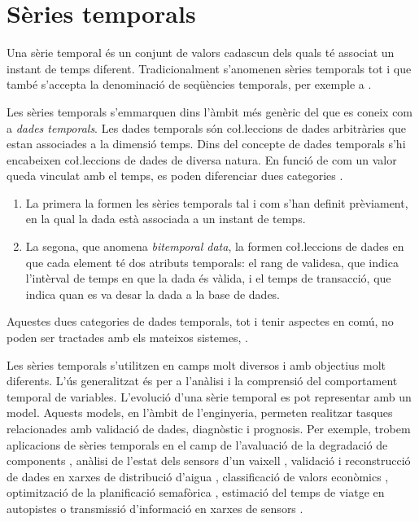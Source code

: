 \section{Sèries temporals}

Una sèrie temporal és un conjunt de valors cadascun dels quals té
associat un instant de temps diferent.  Tradicionalment s'anomenen
sèries temporals tot i que també s'accepta la denominació de
seqüències temporals, per exemple a \cite{last:hetland}.

Les sèries temporals s'emmarquen dins l'àmbit més genèric del que es
coneix com a \emph{dades temporals}. Les dades temporals són
co\l.leccions de dades arbitràries que estan associades a la dimensió
temps.  Dins del concepte de dades temporals s'hi encabeixen
co\l.leccions de dades de diversa natura. En funció de com un valor
queda vinculat amb el temps, es poden diferenciar dues
categories \parencite{assfalg08:thesis}.
\begin{enumerate}
\item La primera la formen les sèries temporals tal i com s'han
  definit prèviament, en la qual la dada està associada a un instant
  de temps.
\item La segona, que anomena \emph{bitemporal data}, la formen
  co\l.leccions de dades en que cada element té dos atributs
  temporals: el rang de validesa, que indica l'intèrval de temps en
  que la dada és vàlida, i el temps de transacció, que indica quan es
  va desar la dada a la base de dades.  
\end{enumerate}
Aquestes dues categories de dades temporals, tot i tenir aspectes en
comú, no poden ser tractades amb els mateixos
sistemes, \parencite{schmidt95}.


Les sèries temporals s'utilitzen en camps molt diversos i amb
objectius molt diferents. L'ús generalitzat és per a l'anàlisi i la
comprensió del comportament temporal de variables. L'evolució d'una
sèrie temporal es pot representar amb un model. Aquests models, en
l'àmbit de l'enginyeria, permeten realitzar tasques relacionades amb
validació de dades, diagnòstic i prognosis.  Per exemple, trobem
aplicacions de sèries temporals en el camp de l'avaluació de la
degradació de components \parencite{yu11}, anàlisi de l'estat dels
sensors d'un vaixell \parencite{palmer07}, validació i reconstrucció
de dades en xarxes de distribució d'aigua \parencite{quevedo10},
classificació de valors econòmics \parencite{dreyer95}, optimització
de la planificació semafòrica \parencite{last11}, estimació del temps
de viatge en autopistes \parencite{soriguera10} o transmissió
d'informació en xarxes de
sensors \parencite{jainagrawal05,yaogehrke02}.


